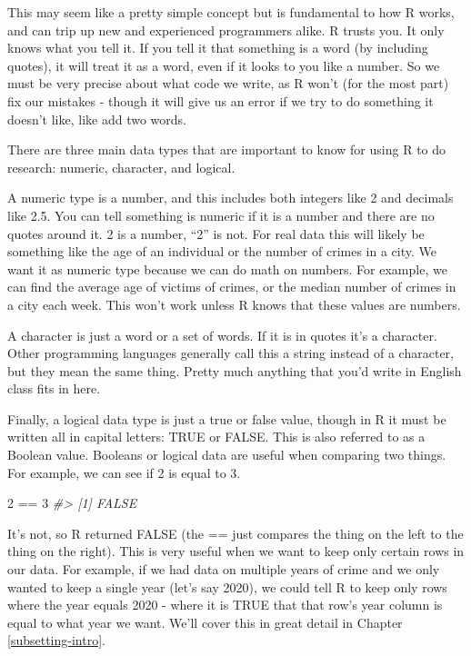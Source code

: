 \documentclass[
]{krantz}
\makeatletter
\newenvironment{Shaded}{\begin{snugshade}}{\end{snugshade}}
\newcommand{\CommentTok}[1]{\textcolor[rgb]{0.37,0.37,0.37}{\textit{#1}}}
\newcommand{\DecValTok}[1]{\textcolor[rgb]{0.06,0.06,0.06}{#1}}
\newcommand{\SpecialCharTok}[1]{\textcolor[rgb]{0,0,0}{#1}}
\newenvironment{kframe}{%
\medskip{}
\setlength{\fboxsep}{.8em}
 \def\at@end@of@kframe{}%
 \ifinner\ifhmode%
  \def\at@end@of@kframe{\end{minipage}}%
  \begin{minipage}{\columnwidth}%
 \fi\fi%
 \def\FrameCommand##1{\hskip\@totalleftmargin \hskip-\fboxsep
 \colorbox{shadecolor}{##1}\hskip-\fboxsep
     \hskip-\linewidth \hskip-\@totalleftmargin \hskip\columnwidth}%
 \MakeFramed {\advance\hsize-\width
   \@totalleftmargin\z@ \linewidth\hsize
   \@setminipage}}%
 {\par\unskip\endMakeFramed%
 \at@end@of@kframe}
\renewenvironment{Shaded}{\begin{kframe}}{\end{kframe}}
\makeatother
\begin{document}
This may seem like a pretty simple concept but is fundamental to how R works, and can trip up new and experienced programmers alike. R trusts you. It only knows what you tell it. If you tell it that something is a word (by including quotes), it will treat it as a word, even if it looks to you like a number. So we must be very precise about what code we write, as R won't (for the most part) fix our mistakes - though it will give us an error if we try to do something it doesn't like, like add two words.

There are three main data types that are important to know for using R to do research: numeric, character, and logical.

A numeric type is a number, and this includes both integers like 2 and decimals like 2.5. You can tell something is numeric if it is a number and there are no quotes around it. 2 is a number, ``2'' is not. For real data this will likely be something like the age of an individual or the number of crimes in a city. We want it as numeric type because we can do math on numbers. For example, we can find the average age of victims of crimes, or the median number of crimes in a city each week. This won't work unless R knows that these values are numbers.

A character is just a word or a set of words. If it is in quotes it's a character. Other programming languages generally call this a string instead of a character, but they mean the same thing. Pretty much anything that you'd write in English class fits in here.

Finally, a logical data type is just a true or false value, though in R it must be written all in capital letters: TRUE or FALSE. This is also referred to as a Boolean value. Booleans or logical data are useful when comparing two things. For example, we can see if 2 is equal to 3.

\begin{Shaded}
\begin{Highlighting}[]
\DecValTok{2} \SpecialCharTok{==} \DecValTok{3}
\CommentTok{\#\textgreater{} [1] FALSE}
\end{Highlighting}
\end{Shaded}

It's not, so R returned FALSE (the == just compares the thing on the left to the thing on the right). This is very useful when we want to keep only certain rows in our data. For example, if we had data on multiple years of crime and we only wanted to keep a single year (let's say 2020), we could tell R to keep only rows where the year equals 2020 - where it is TRUE that that row's year column is equal to what year we want. We'll cover this in great detail in Chapter \ref{subsetting-intro}.
\end{document}
